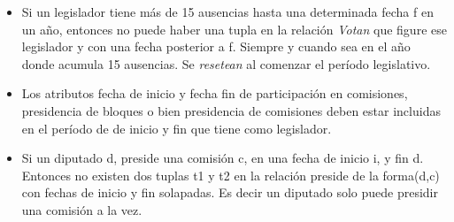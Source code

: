 \begin{itemize}
	\item Si un legislador tiene m\'as de 15 ausencias hasta una determinada fecha f en un a\~no, entonces no puede haber una tupla en la relaci\'on \textit{Votan} que figure ese legislador y con una fecha posterior a f. Siempre y cuando sea en el a\~no donde acumula 15 ausencias. Se \textit{resetean} al comenzar el per\'iodo legislativo.
	
	\item Los atributos fecha de inicio y fecha fin de participaci\'on en comisiones, presidencia de bloques o bien presidencia de comisiones deben estar incluidas en el per\'iodo de de inicio y fin que tiene como legislador.
	
	\item Si un diputado d, preside una comisi\'on c, en una fecha de inicio i, y fin d. Entonces no existen dos tuplas t1 y t2 en la relaci\'on preside de la forma(d,c) con fechas de inicio y fin solapadas. Es decir un diputado solo puede presidir una comisi\'on a la vez.


\end{itemize}	